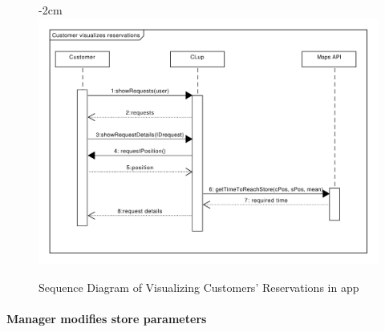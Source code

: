 \documentclass{article}
\begin{document}
												\begin{figure}
								\begin{adjustwidth} {-2cm}{}
									\centering
									\includegraphics[scale=0.75]{SD/6_visualizeReservation.pdf}\\
									\caption{Sequence Diagram of Visualizing Customers' Reservations in app}
								\end{adjustwidth}
							\end{figure}
			\newpage
			\paragraph{Manager modifies store parameters}
			
\end{document}
